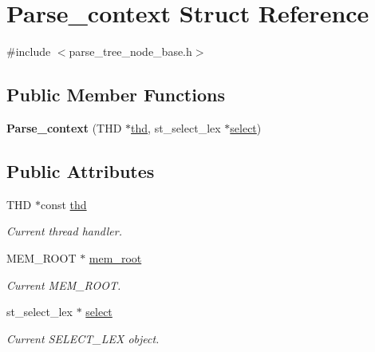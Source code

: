 \hypertarget{structParse__context}{}\section{Parse\+\_\+context Struct Reference}
\label{structParse__context}


{\ttfamily \#include $<$parse\+\_\+tree\+\_\+node\+\_\+base.\+h$>$}

\subsection*{Public Member Functions}
\begin{DoxyCompactItemize}
\item 
\mbox{\label{structParse__context_a761e2898c3ff1f21ce4ecceb26d82070}} 
{\bfseries Parse\+\_\+context} (T\+HD $\ast$\mbox{\hyperlink{structParse__context_a831e53d9c9f74786844310e6cf461a33}{thd}}, st\+\_\+select\+\_\+lex $\ast$\mbox{\hyperlink{structParse__context_a031ac24824e642017d9fbdac6a9b3774}{select}})
\end{DoxyCompactItemize}
\subsection*{Public Attributes}
\begin{DoxyCompactItemize}
\item 
\mbox{\label{structParse__context_a831e53d9c9f74786844310e6cf461a33}} 
T\+HD $\ast$const \mbox{\hyperlink{structParse__context_a831e53d9c9f74786844310e6cf461a33}{thd}}
\begin{DoxyCompactList}\small\item\em Current thread handler. \end{DoxyCompactList}\item 
\mbox{\label{structParse__context_ab7900c39d3664f03413e9cf3b7fa98c0}} 
M\+E\+M\+\_\+\+R\+O\+OT $\ast$ \mbox{\hyperlink{structParse__context_ab7900c39d3664f03413e9cf3b7fa98c0}{mem\+\_\+root}}
\begin{DoxyCompactList}\small\item\em Current M\+E\+M\+\_\+\+R\+O\+OT. \end{DoxyCompactList}\item 
\mbox{\label{structParse__context_a031ac24824e642017d9fbdac6a9b3774}} 
st\+\_\+select\+\_\+lex $\ast$ \mbox{\hyperlink{structParse__context_a031ac24824e642017d9fbdac6a9b3774}{select}}
\begin{DoxyCompactList}\small\item\em Current S\+E\+L\+E\+C\+T\+\_\+\+L\+EX object. \end{DoxyCompactList}\end{DoxyCompactItemize}


